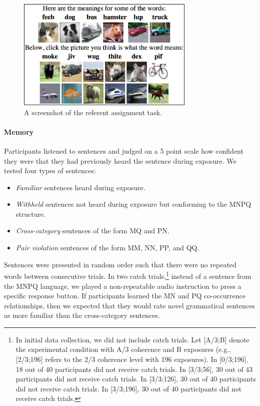 \documentclass[man,floatsintext]{apa6}
\begin{document}
\begin{figure}[t]
  \begin{center}
    \includegraphics[width=8.5cm]{meaning-html-cropped.png}
    \caption{A screenshot of the referent assignment task.}
    \label{meaning-task}
  \end{center}
\end{figure}

\paragraph{Memory}
Participants listened to sentences and judged on a 5 point scale how confident they were that they had previously heard the sentence during exposure. We tested four types of sentences:

\begin{itemize}
\item \emph{Familiar} sentences heard during exposure.
\item \emph{Withheld} sentences not heard during exposure but
conforming to the MNPQ structure.
\item \emph{Cross-category} sentences of the form MQ and PN.
\item \emph{Pair violation} sentences of the form MM, NN, PP, and
QQ.
\end{itemize}

Sentences were presented in random order such that there were no repeated words between consecutive trials. In two catch trials,\footnote{In initial data collection, we did not include catch trials.  Let [A/3;B] denote the experimental condition with A/3 coherence and B exposures (e.g., [2/3;196] refers to the 2/3 coherence level with 196 exposures). In [0/3;196], 18 out of 40 participants did not receive catch trials. In [3/3;56], 30 out of 43 participants did not receive catch trials. In [3/3;126], 30 out of 40 participants did not receive catch trials. In [3/3;196], 30 out of 40 participants did not receive catch trials.} instead of a sentence from the MNPQ language, we played a non-repeatable audio instruction to press a specific response button.  If participants learned the MN and PQ co-occurrence relationships, then we expected that they would rate novel grammatical sentences as more familiar than the cross-category sentences.
\end{document}
